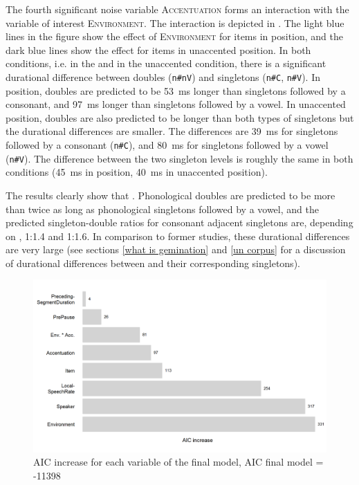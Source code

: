 The fourth significant noise variable \textsc{Accentuation} forms an interaction with the variable of interest \textsc{Environment}. The interaction is depicted in .
The light blue lines in the figure show the effect of \textsc{Environment} for items in  position, and the dark blue lines show the effect for items in unaccented position. In both conditions, i.e. in the  and in the unaccented condition, there is a significant durational difference between doubles (\texttt{n\#nV}) and singletons (\texttt{n\#C}, \texttt{n\#V}). 
 In  position, doubles are predicted to be 53~ms longer than singletons followed by a consonant, and 97~ms longer than singletons followed by a vowel. 
 In unaccented position, doubles are also predicted to be longer than both types of singletons but the durational differences are smaller. The differences are 39~ms  for singletons followed by a consonant (\texttt{n\#C}), and 80~ms for singletons followed by a vowel (\texttt{n\#V}). The difference between the two singleton levels is roughly the same in both conditions (45~ms in  position, 40~ms in unaccented position).




 The results clearly show that  . Phonological doubles are predicted to be more than twice as long as phonological singletons followed by a vowel, and the predicted singleton-double ratios for consonant adjacent singletons are, depending on , 1:1.4 and 1:1.6. In comparison to former studies, these durational differences are very large (see sections \ref{what is gemination} and \ref{un corpus} for a discussion of durational differences between  and their corresponding singletons). 




\begin{figure}
	
	
	\includegraphics[scale=0.7] {images/Experiment/AICdecreaseUnComplex.png}


	\caption{AIC increase for each variable of the final model, AIC final model = -11398}
	\label{fig:Effect sozed un Exp unV vs Unn}

\end{figure}



